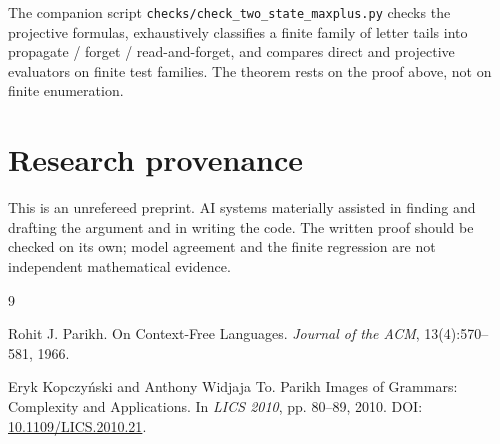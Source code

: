 \documentclass[11pt]{article}
\begin{document}
The companion script \texttt{checks/check\_two\_state\_maxplus.py} checks the projective formulas, exhaustively classifies a finite family of letter tails into propagate / forget / read-and-forget, and compares direct and projective evaluators on finite test families. The theorem rests on the proof above, not on finite enumeration.

\section*{Research provenance}

This is an unrefereed preprint. AI systems materially assisted in finding and drafting the argument and in writing the code. The written proof should be checked on its own; model agreement and the finite regression are not independent mathematical evidence.

\begin{thebibliography}{9}
\small
\setlength{\itemsep}{0.35em}

Rohit J. Parikh.
\newblock On Context-Free Languages.
\newblock \emph{Journal of the ACM}, 13(4):570--581, 1966.

Eryk Kopczy\'nski and Anthony Widjaja To.
\newblock Parikh Images of Grammars: Complexity and Applications.
\newblock In \emph{LICS 2010}, pp. 80--89, 2010.
\newblock DOI: \href{https://doi.org/10.1109/LICS.2010.21}{10.1109/LICS.2010.21}.

\end{thebibliography}
\end{document}

